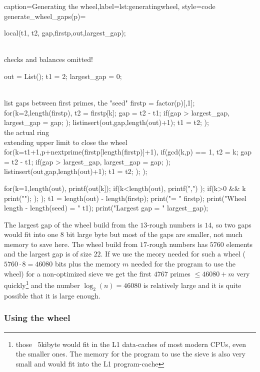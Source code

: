\documentclass[a4paper,10pt]{report}
\theoremstyle{plain} %
\theoremstyle{definition}
\theoremstyle{remark}
\begin{document}
\lstset{language=parigp,style=widercode}
\begin{pblisting}{caption={Generating the wheel},label=lst:generatingwheel, style=code}
generate_wheel_gaps(p)={
  local(t1, t2, gap,firstp,out,largest_gap);

  \\ checks and balances omitted!

  out = List();
  t1 = 2;
  largest_gap = 0;

  \\ list gaps between first primes, the "seed"
  firstp = factor(p)[,1];
  for(k=2,length(firstp),
     t2 = firstp[k];
     gap = t2 - t1;
     if(gap > largest_gap,
        largest_gap = gap;
     );
     listinsert(out,gap,length(out)+1);
     t1 = t2;
  );
  \\ the actual ring
  \\ extending upper limit to close the wheel
  for(k=t1+1,p+nextprime(firstp[length(firstp)]+1),
     if(gcd(k,p) == 1,
        t2 = k;
        gap = t2 - t1;
        if(gap > largest_gap,
           largest_gap = gap;
        );
        listinsert(out,gap,length(out)+1);
        t1 = t2;
     );
  );

  for(k=1,length(out),
     printf(out[k]);
     if(k<length(out),
        printf(",")
     );
     if(k>0 && k %
        print("");
     );
  );
  t1 = length(out) - length(firstp);
  print("\nseed = " firstp);
  print("Wheel length - length(seed) = " t1);
  print("Largest gap = " largest_gap);
}
\end{pblisting}
The largest gap of the wheel build from the $13$-rough numbers is $14$, so two gaps would fit into one 8 bit large byte but most of the gaps are smaller, not much memory to save here. The wheel build from $17$-rough numbers has $5760$ elements and the largest gap is of size $22$. If we use the meory needed for such a wheel ($5760 \cdot 8 = 46080$ bits plus the memory $m$ needed for the program to use the wheel) for a non-optimized sieve we get the first $4767$ primes $\le 46080 + m$ very quickly\footnote{those ~5kibyte would fit in the L1 data-caches of most modern CPUs, even the smaller ones. The memory for the program to use the sieve is also very small and would fit into the L1 program-cache} and the number $\log_2(n) = 46080$ is relatively large and it is quite possible that it is large enough.
\subsubsection{Using the wheel} %
\end{document}
